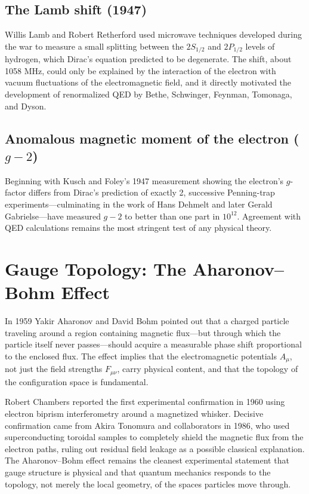 \documentclass[11pt]{article}
\begin{document}
\subsection{The Lamb shift (1947)}
Willis Lamb and Robert Retherford used microwave techniques developed during the war to measure a small splitting between the $2S_{1/2}$ and $2P_{1/2}$ levels of hydrogen, which Dirac's equation predicted to be degenerate. The shift, about 1058 MHz, could only be explained by the interaction of the electron with vacuum fluctuations of the electromagnetic field, and it directly motivated the development of renormalized QED by Bethe, Schwinger, Feynman, Tomonaga, and Dyson.

\subsection{Anomalous magnetic moment of the electron ($g-2$)}
Beginning with Kusch and Foley's 1947 measurement showing the electron's $g$-factor differs from Dirac's prediction of exactly 2, successive Penning-trap experiments---culminating in the work of Hans Dehmelt and later Gerald Gabrielse---have measured $g-2$ to better than one part in $10^{12}$. Agreement with QED calculations remains the most stringent test of any physical theory.

\section{Gauge Topology: The Aharonov--Bohm Effect}

In 1959 Yakir Aharonov and David Bohm pointed out that a charged particle traveling around a region containing magnetic flux---but through which the particle itself never passes---should acquire a measurable phase shift proportional to the enclosed flux. The effect implies that the electromagnetic potentials $A_\mu$, not just the field strengths $F_{\mu\nu}$, carry physical content, and that the topology of the configuration space is fundamental.

Robert Chambers reported the first experimental confirmation in 1960 using electron biprism interferometry around a magnetized whisker. Decisive confirmation came from Akira Tonomura and collaborators in 1986, who used superconducting toroidal samples to completely shield the magnetic flux from the electron paths, ruling out residual field leakage as a possible classical explanation. The Aharonov--Bohm effect remains the cleanest experimental statement that gauge structure is physical and that quantum mechanics responds to the topology, not merely the local geometry, of the spaces particles move through.
\end{document}
